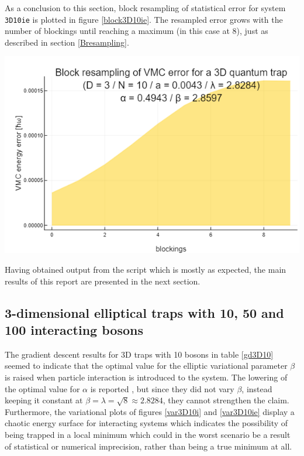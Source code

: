 \documentclass[a4paper,8pt]{article}
\begin{document}
\begin{multicols}{2}
As a conclusion to this section, block resampling of statistical error for system \texttt{3D10ie} is plotted in figure \ref{block3D10ie}. The resampled error grows with the number of blockings until reaching a maximum (in this case at 8), just as described in section \ref{Bresampling}.

\begin{center}
\includegraphics[width=0.9\columnwidth]{fig3D10ie_resampling}
\label{block3D10ie}
\end{center}

Having obtained output from the script which is mostly as expected, the main results of this report are presented in the next section.



\subsection{3-dimensional elliptical traps with 10, 50 and 100 interacting bosons}\label{3Die}
The gradient descent results for 3D traps with 10 bosons in table \ref{gd3D10} seemed to indicate that the optimal value for the elliptic variational parameter $\beta$ is raised when particle interaction is introduced to the system. The lowering of the optimal value for $\alpha$ is reported \cite{SWL}, but since they did not vary $\beta$, instead keeping it constant at ${\beta = \lambda = \sqrt{8} \approx 2.8284}$, they cannot strengthen the claim. Furthermore, the variational plots of figures \ref{var3D10i} and \ref{var3D10ie} display a chaotic energy surface for interacting systems which indicates the possibility of being trapped in a local minimum which could in the worst scenario be a result of statistical or numerical imprecision, rather than being a true minimum at all.


\end{multicols}
\end{document}
